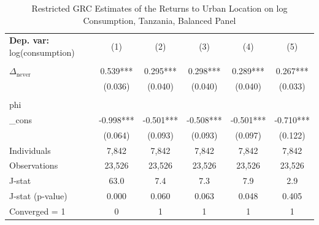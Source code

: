 \begin{table}[htbp] \centering \begin{threeparttable}
 \caption{Restricted GRC Estimates of the Returns to Urban Location on log Consumption, Tanzania, Balanced Panel} 
 \label{tab:GRC_TZA_consumption_urban_bal} 
\begin{tabular}{l ccccc} \toprule  \textbf{Dep. var:}  log(consumption) 
                    &\multicolumn{1}{c}{(1)}   &\multicolumn{1}{c}{(2)}   &\multicolumn{1}{c}{(3)}   &\multicolumn{1}{c}{(4)}   &\multicolumn{1}{c}{(5)}   \\
                    &               &               &               &               &               \\
\addlinespace
$\Delta_{\text{never}}$&       0.539***&       0.295***&       0.298***&       0.289***&       0.267***\\
                    &     (0.036)   &     (0.040)   &     (0.040)   &     (0.040)   &     (0.033)   \\
                    &               &               &               &               &               \\
\addlinespace
phi                 &               &               &               &               &               \\
_cons               &      -0.998***&      -0.501***&      -0.508***&      -0.501***&      -0.710***\\
                    &     (0.064)   &     (0.093)   &     (0.093)   &     (0.097)   &     (0.122)   \\
\addlinespace
Individuals         &       7,842   &       7,842   &       7,842   &       7,842   &       7,842   \\
Observations        &      23,526   &      23,526   &      23,526   &      23,526   &      23,526   \\
J-stat              &        63.0   &         7.4   &         7.3   &         7.9   &         2.9   \\
J-stat (p-value)    &       0.000   &       0.060   &       0.063   &       0.048   &       0.405   \\
Converged = 1       &           0   &           1   &           1   &           1   &           1   \\

\end{tabular}
\end{threeparttable}
\end{table}
